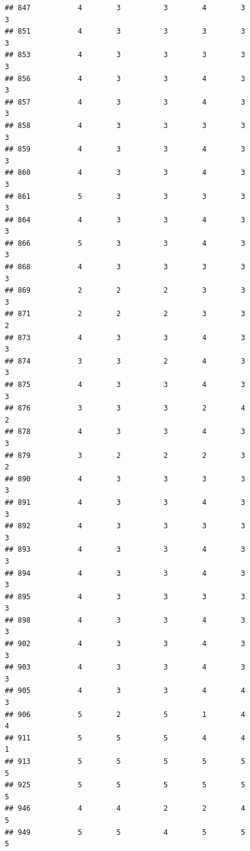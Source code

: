 \documentclass[
]{article}
\begin{document}
\begin{verbatim}
## 847           4        3          3        4        3               3
## 851           4        3          3        3        3               3
## 853           4        3          3        3        3               3
## 856           4        3          3        4        3               3
## 857           4        3          3        4        3               3
## 858           4        3          3        3        3               3
## 859           4        3          3        4        3               3
## 860           4        3          3        4        3               3
## 861           5        3          3        3        3               3
## 864           4        3          3        4        3               3
## 866           5        3          3        4        3               3
## 868           4        3          3        3        3               3
## 869           2        2          2        3        3               3
## 871           2        2          2        3        3               2
## 873           4        3          3        4        3               3
## 874           3        3          2        4        3               3
## 875           4        3          3        4        3               3
## 876           3        3          3        2        4               2
## 878           4        3          3        4        3               3
## 879           3        2          2        2        3               2
## 890           4        3          3        3        3               3
## 891           4        3          3        4        3               3
## 892           4        3          3        3        3               3
## 893           4        3          3        4        3               3
## 894           4        3          3        4        3               3
## 895           4        3          3        3        3               3
## 898           4        3          3        4        3               3
## 902           4        3          3        4        3               3
## 903           4        3          3        4        3               3
## 905           4        3          3        4        4               3
## 906           5        2          5        1        4               4
## 911           5        5          5        4        4               1
## 913           5        5          5        5        5               5
## 925           5        5          5        5        5               5
## 946           4        4          2        2        4               5
## 949           5        5          4        5        5               5

\end{verbatim}
\end{document}
